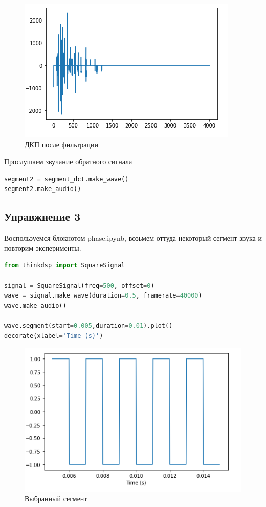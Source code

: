 \begin{figure}[H]
	\begin{center}
		\includegraphics[scale=1]{fig/lab06/lab06_06.png}
		\caption{ДКП после фильтрации}
	\end{center}
\end{figure}

Прослушаем звучание обратного сигнала

\begin{lstlisting}[language=Python]
segment2 = segment_dct.make_wave()
segment2.make_audio()
\end{lstlisting}


\subsection{Управжнение 3}

Воспользуемся блокнотом phase.ipynb, возьмем оттуда некоторый сегмент звука и повторим эксперименты.

\begin{lstlisting}[language=Python]
from thinkdsp import SquareSignal

signal = SquareSignal(freq=500, offset=0)
wave = signal.make_wave(duration=0.5, framerate=40000)
wave.make_audio()

wave.segment(start=0.005,duration=0.01).plot()
decorate(xlabel='Time (s)')
\end{lstlisting}

\begin{figure}[H]
	\begin{center}
		\includegraphics[scale=1]{fig/lab06/lab06_07.png}
		\caption{Выбранный сегмент}
	\end{center}
\end{figure}

